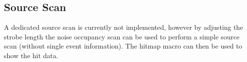 \documentclass{article}
\begin{document}
\subsection{Source Scan}
A dedicated source scan is currently not implemented, however by adjusting the strobe length the noise occupancy scan can be used to perform a simple source scan (without single event information). The hitmap macro can then be used to show the hit data.
\end{document}
